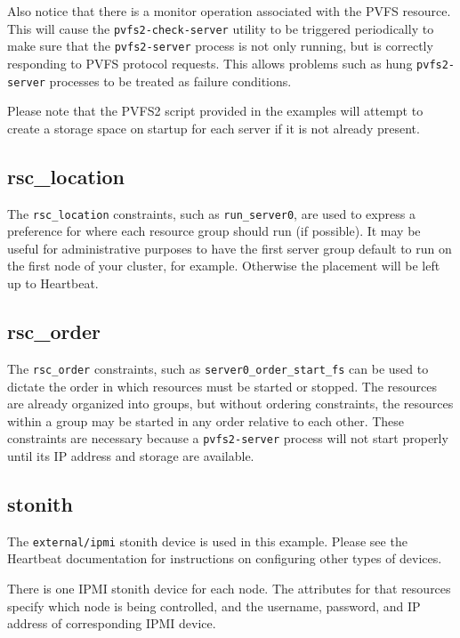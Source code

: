 \documentclass[11pt]{article}
\begin{document}
Also notice that there is a monitor operation associated with the PVFS
resource.  This will cause the \texttt{pvfs2-check-server} utility to be triggered
periodically to make sure that the \texttt{pvfs2-server} process is not only
running, but is correctly responding to PVFS protocol requests.  This
allows problems such as hung \texttt{pvfs2-server} processes to be treated as
failure conditions.

Please note that the PVFS2 script provided in the examples will attempt
to create a storage space on startup for each server if it is not already present.

\subsection{rsc\_location}

The \texttt{rsc\_location} constraints, such as \texttt{run\_server0},
are used to express a preference for where each resource group should
run (if possible).  It may be useful for administrative purposes to have
the first server group default to run on the first node of your cluster,
for example.  Otherwise the placement will be left up to Heartbeat.

\subsection{rsc\_order}

The \texttt{rsc\_order} constraints, such as
\texttt{server0\_order\_start\_fs} can be used to dictate the order in
which resources must be started or stopped.  The resources are already
organized into groups, but without ordering constraints, the resources
within a group may be started in any order relative to each other.
These constraints are necessary because a \texttt{pvfs2-server} process will not
start properly until its IP address and storage are available.

\subsection{stonith}

The \texttt{external/ipmi} stonith device is used in this example.
Please see the Heartbeat documentation for instructions on configuring
other types of devices.

There is one IPMI stonith device for each node.  The attributes for that
resources specify which node is being controlled, and the username,
password, and IP address of corresponding IPMI device.
\end{document}

